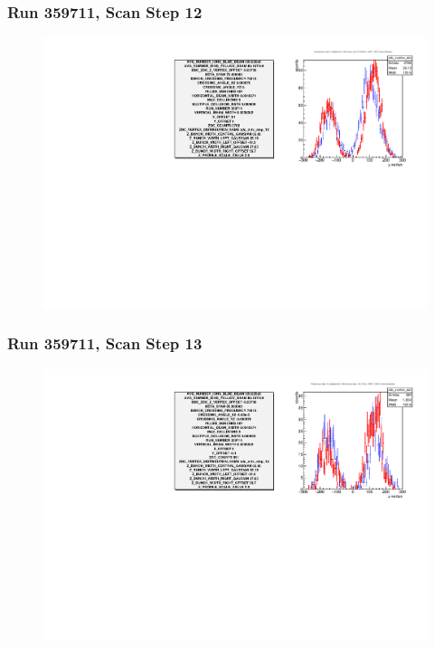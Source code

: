 \begin{frame}
\frametitle{Run 359711, Scan Step 12}
\begin{figure}
\begin{center}
\includegraphics[width=\linewidth]{"figures/359711_step_12_zdc_zvertex"}
\caption{ }
\label{fig:359711_step_12_zdc_zvertex}
\end{center}\end{figure}
\end{frame}

\begin{frame}
\frametitle{Run 359711, Scan Step 13}
\begin{figure}
\begin{center}
\includegraphics[width=\linewidth]{"figures/359711_step_13_zdc_zvertex"}
\caption{ }
\label{fig:359711_step_13_zdc_zvertex}
\end{center}\end{figure}
\end{frame}

